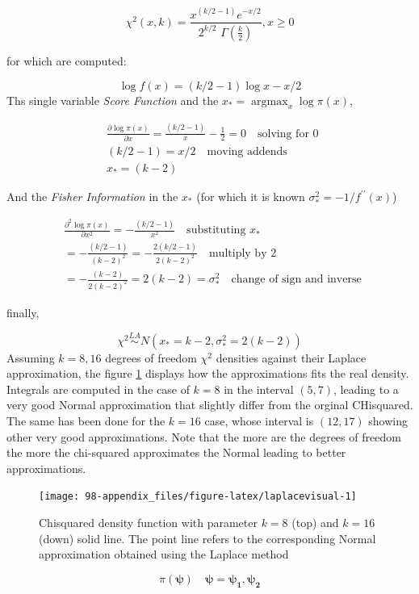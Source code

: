 \documentclass[
  12pt,
  a4paper,
  oneside]{book}
\theoremstyle{definition}
\theoremstyle{definition}
\theoremstyle{definition}
\theoremstyle{remark}
\begin{document}
\[
\chi^{2}(x,k)=\frac{x^{(k / 2-1)} e^{-x / 2}}{2^{k / 2} \,\, \Gamma\left(\frac{k}{2}\right)}, x \geq 0
\]

for which are computed:

\[
\log f(x)=(k / 2-1) \log x-x / 2
\]
Ths single variable \emph{Score Function} and the \(x_{*}=\operatorname{argmax}_{x} \log \pi(x)\),

\begin{equation}
\begin{aligned} 
  &\frac{\partial \log \pi(x)}{\partial x}= \frac{(k/2 -1)}{x} - \frac{1}{2} =0 \quad \text {solving for 0 }\\
  &(k/2-1) = x/2\quad \text {moving addends}\\
  &x_* = (k-2) 
\end{aligned}
\end{equation}

And the \emph{Fisher Information} in the \(x_*\) (for which it is known \(\sigma^{2}_*=-1 / f^{\prime \prime}(x)\))

\begin{equation} 
\begin{split}
  &\frac{\partial^2 \log \pi(x)}{\partial x^2}=-\frac{(k / 2-1) }{x^{2}} \quad \text {substituting} \,\,x_* \\
  &= -\frac{(k / 2-1) }{(k-2)^{2}} = - \frac{2(k/2-1)}{2(k-2)^{2}} \quad \text {multiply by 2 } \\
  &=-  \frac{(k-2)}{2(k-2)^{2}} = 2(k-2)  = \sigma^{2}_*\quad \text {change of sign and inverse }
\end{split}
\end{equation}

finally,

\[
\chi^{2} \stackrel{L A}{\sim} N\left(x_*=k-2, \sigma^{2}_*=2(k-2)\right)
\]
Assuming \(k = 8, 16\) degrees of freedom \(\chi^{2}\) densities against their Laplace approximation, the figure \ref{fig:laplacevisual} displays how the approximations fits the real density. Integrals are computed in the case of \(k = 8\) in the interval \((5, 7)\), leading to a very good Normal approximation that slightly differ from the orginal CHisquared. The same has been done for the \(k = 16\) case, whose interval is \((12, 17)\) showing other very good approximations. Note that the more are the degrees of freedom the more the chi-squared approximates the Normal leading to better approximations.

\begin{figure}

{\centering \texttt{[image: 98-appendix\_files/figure-latex/laplacevisual-1]} 

}

\caption{Chisquared density function with parameter $k = 8$ (top) and $k = 16$ (down) solid line. The point line refers to the corresponding Normal approximation obtained using the Laplace method}\label{fig:laplacevisual}
\end{figure}

\[
\pi(\boldsymbol{\psi}) \quad \boldsymbol{\psi}= \boldsymbol{\psi_1}, \boldsymbol{\psi_2}
\]

  
\end{document}
